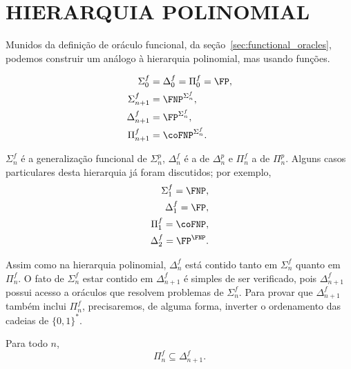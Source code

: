 \section{HIERARQUIA POLINOMIAL}

Munidos da definição de oráculo funcional,
da seção~\ref{sec:functional_oracles},
podemos construir um análogo à hierarquia polinomial,
mas usando funções.

\begin{definition}
    \begin{align*}
        \Sigma_0^f &= \Delta_0^f = \Pi_0^f = \FP, \\
        \Sigma_{n+1}^f &= \FNP^{\Sigma_n^f}, \\
        \Delta_{n+1}^f &= \FP^{\Sigma_n^f}, \\
        \Pi_{n+1}^f &= \coFNP^{\Sigma_n^f}.
    \end{align*}
\end{definition}

$\Sigma_n^f$ é a generalização funcional de $\Sigma_n^p$,
$\Delta_n^f$ é a de $\Delta_n^p$
e $\Pi_n^f$ a de $\Pi_n^p$.
Alguns casos particulares desta hierarquia já foram discutidos;
por exemplo,
\begin{align*}
    \Sigma_1^f = \FNP, \\
    \Delta_1^f = \FP, \\
    \Pi_1^f = \coFNP, \\
    \Delta_2^f = \FP^\FNP.
\end{align*}

Assim como na hierarquia polinomial,
$\Delta_n^f$ está contido tanto em $\Sigma_n^f$ quanto em $\Pi_n^f$.
O fato de $\Sigma_n^f$ estar contido em $\Delta_{n+1}^f$
é simples de ser verificado,
pois $\Delta_{n+1}^f$ possui acesso a oráculos
que resolvem problemas de $\Sigma_n^f$.
Para provar que $\Delta_{n+1}^f$ também inclui $\Pi_n^f$,
precisaremos, de alguma forma,
inverter o ordenamento das cadeias de $\{0, 1\}^*$.

\begin{proposition}
    Para todo $n$,
    \begin{equation*}
        \Pi_n^f \subseteq \Delta_{n+1}^f.
    \end{equation*}
    \label{thm:pi_f_subseteq_delta_f}
\end{proposition}

